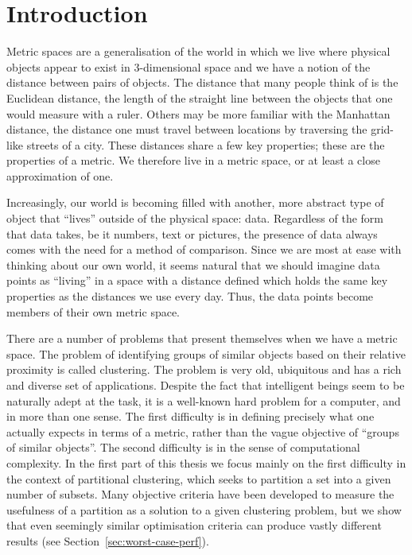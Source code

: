 \chapter{Introduction}
\label{cha:introduction}

Metric spaces are a generalisation of the world in which we live where
physical objects appear to exist in 3-dimensional space and we have a notion
of the distance between pairs of objects.  The distance that many people think
of is the Euclidean distance, the length of the straight line between the
objects that one would measure with a ruler.  Others may be more familiar with
the Manhattan distance, the distance one must travel between locations by
traversing the grid-like streets of a city.  These distances share a few key
properties; these are the properties of a metric.  We therefore live in a
metric space, or at least a close approximation of one.

Increasingly, our world is becoming filled with another, more abstract type of
object that ``lives'' outside of the physical space: data.  Regardless of the
form that data takes, be it numbers, text or pictures, the presence of data
always comes with the need for a method of comparison.  Since we are most at
ease with thinking about our own world, it seems natural that we should
imagine data points as ``living'' in a space with a distance defined which
holds the same key properties as the distances we use every day.  Thus, the
data points become members of their own metric space.

There are a number of problems that present themselves when we have a metric
space.  The problem of identifying groups of similar objects based on their
relative proximity is called clustering.  The problem is very old, ubiquitous
and has a rich and diverse set of applications.  Despite the fact that
intelligent beings seem to be naturally adept at the task, it is a well-known
hard problem for a computer, and in more than one sense.  The first difficulty
is in defining precisely what one actually expects in terms of a metric,
rather than the vague objective of ``groups of similar objects''.  The second
difficulty is in the sense of computational complexity.  In the first part of
this thesis we focus mainly on the first difficulty in the context of
partitional clustering, which seeks to partition a set into a given number of
subsets.  Many objective criteria have been developed to measure the
usefulness of a partition as a solution to a given clustering problem, but we
show that even seemingly similar optimisation criteria can produce vastly
different results (see Section~\ref{sec:worst-case-perf}).

